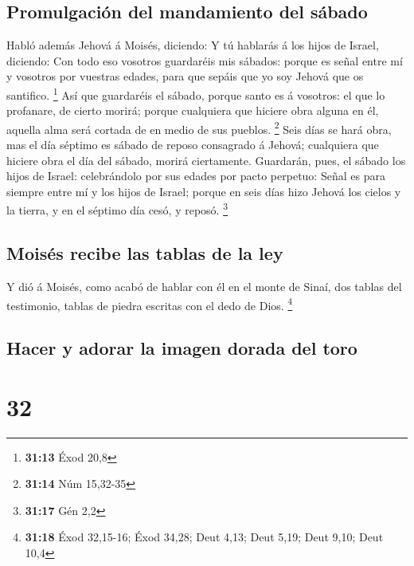 \hypertarget{promulgaciuxf3n-del-mandamiento-del-suxe1bado}{%
\subsection{Promulgación del mandamiento del
sábado}\label{promulgaciuxf3n-del-mandamiento-del-suxe1bado}}

 Habló además Jehová á Moisés, diciendo: 
Y tú hablarás á los hijos de Israel, diciendo: Con todo eso vosotros
guardaréis mis sábados: porque es señal entre mí y vosotros por vuestras
edades, para que sepáis que yo soy Jehová que os santifico. \footnote{\textbf{31:13}
  Éxod 20,8}  Así que guardaréis el sábado, porque santo
es á vosotros: el que lo profanare, de cierto morirá; porque cualquiera
que hiciere obra alguna en él, aquella alma será cortada de en medio de
sus pueblos. \footnote{\textbf{31:14} Núm 15,32-35}  Seis
días se hará obra, mas el día séptimo es sábado de reposo consagrado á
Jehová; cualquiera que hiciere obra el día del sábado, morirá
ciertamente.  Guardarán, pues, el sábado los hijos de
Israel: celebrándolo por sus edades por pacto perpetuo: 
Señal es para siempre entre mí y los hijos de Israel; porque en seis
días hizo Jehová los cielos y la tierra, y en el séptimo día cesó, y
reposó. \footnote{\textbf{31:17} Gén 2,2}

\hypertarget{moisuxe9s-recibe-las-tablas-de-la-ley}{%
\subsection{Moisés recibe las tablas de la
ley}\label{moisuxe9s-recibe-las-tablas-de-la-ley}}

 Y dió á Moisés, como acabó de hablar con él en el monte
de Sinaí, dos tablas del testimonio, tablas de piedra escritas con el
dedo de Dios. \footnote{\textbf{31:18} Éxod 32,15-16; Éxod 34,28; Deut
  4,13; Deut 5,19; Deut 9,10; Deut 10,4}

\hypertarget{hacer-y-adorar-la-imagen-dorada-del-toro}{%
\subsection{Hacer y adorar la imagen dorada del
toro}\label{hacer-y-adorar-la-imagen-dorada-del-toro}}

\hypertarget{section-31}{%
\section{32}\label{section-31}}

